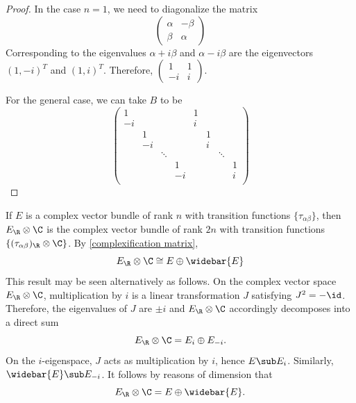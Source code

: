 \begin{proof}
In the case $n=1$, we need to diagonalize the matrix
\[\begin{pmatrix}
\alpha&-\beta\\
\beta&\alpha
\end{pmatrix}\]
Corresponding to the eigenvalues $\alpha+i\beta$ and $\alpha-i\beta$ are the eigenvectors $(1,-i)^T$ and $(1,i)^T$. Therefore, 
$(\begin{smallmatrix}
1&1\\
-i&i
\end{smallmatrix})$.\par
For the general case, we can take $B$ to be
\[\begin{pmatrix}
 1&  &      &  &1& &      & \\
-i&  &      &  &i& &      & \\
  & 1&      &  & &1&      & \\
  &-i&      &  & &i&      & \\
  &  &\ddots&  & & &\ddots& \\
  &  &      & 1& & &      &1\\
  &  &      &-i& & &      &i\\
\end{pmatrix}\]
\end{proof}
If $E$ is a complex vector bundle of rank $n$ with transition functions $\{\tau_{\alpha\beta}\}$, then $E_{\R}\otimes\C$ is the complex vector bundle of rank $2n$ with 
transition functions $\{(\tau_{\alpha\beta})_{\R}\otimes\C\}$. By \cref{complexification matrix},
\[E_{\R}\otimes\C\cong E\oplus\widebar{E}\]
This result may be seen alternatively as follows. On the complex vector space $E_{\R}\otimes\C$, multiplication by $i$ is a linear transformation $J$ satisfying 
$J^2=-\id$. Therefore, the eigenvalues of $J$ are $\pm i$ and $E_{\R}\otimes\C$ accordingly decomposes into a direct sum
\[E_{\R}\otimes\C=E_{i}\oplus E_{-i}.\]
On the $i$-eigenspace, $J$ acts as multiplication by $i$, hence $E\sub E_{i}$. Similarly, $\widebar{E}\sub E_{-i}$. It follows by reasons of dimension that 
\[E_{\R}\otimes\C=E\oplus\widebar{E}.\]
